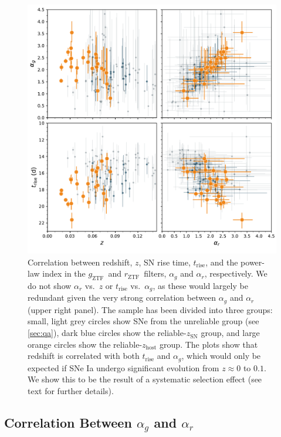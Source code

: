 \documentclass[twocolumn]{aastex63}
\newcommand{\rztf}{$r_\mathrm{ZTF}$}
\newcommand{\gztf}{$g_\mathrm{ZTF}$}
\begin{document}
\begin{figure}
    \centering
    \includegraphics[width=6in]{./figures/param_correlations.pdf}
    \caption{Correlation between redshift, $z$, SN rise time,
    $t_\mathrm{rise}$, and the power-law index in the \gztf\ and \rztf\
    filters, $\alpha_g$ and $\alpha_r$, respectively. We do not show
    $\alpha_r$ vs.~$z$ or $t_\mathrm{rise}$ vs.~$\alpha_g$, as these would
    largely be redundant given the very strong correlation between $\alpha_g$
    and $\alpha_r$ (upper right panel). The sample has been divided into three
    groups: small, light grey circles show SNe from the unreliable group (see
    \ref{sec:qa}), dark blue circles show the reliable-$z_\mathrm{SN}$ group,
    and large orange circles show the reliable-$z_\mathrm{host}$ group. The
    plots show that redshift is correlated with both $t_\mathrm{rise}$ and
    $\alpha_g$, which would only be expected if SNe Ia undergo significant
    evolution from $z \approx 0$ to $0.1$. We show this to be the result
    of a systematic selection effect (see text for further details). }
    \label{fig:model_parameters}
\end{figure}

\subsection{Correlation Between $\alpha_g$ and $\alpha_r$}\label{sec:alpha_correlation}
\end{document}
